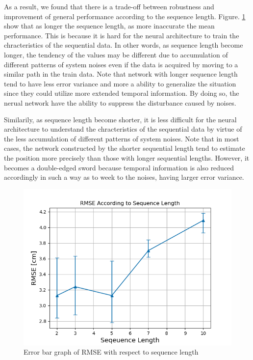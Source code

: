 \documentclass{ieeeaccess}
\begin{document}
As a result, we found that there is a trade-off between robustness and improvement of general performance according to the sequence length. Figure. \ref{fig:seq_length} show that as longer the sequence length, as more inaccurate the mean performance. This is because it is hard for the neural architecture to train the chracteristics of the sequential data. In other words, as sequence length become longer, the tendency of the values may be different due to accumulation of different patterns of system noises even if the data is acquired by moving to a similar path in the train data. Note that network with longer sequence length tend to have less error variance and more a ability to generalize the situation since they could utilize more extended temporal information. By doing so, the nerual network have the ability to suppress the disturbance caused by noises.

Similarily, as sequence length become shorter, it is less difficult for the neural architecture to understand the chracteristics of the sequential data by virtue of the less accumulation of different patterns of system noises. Note that in most cases, the network constructed by the shorter sequential length tend to estimate the position more precisely than those with longer sequential lengths. However, it becomes a double-edged sword because temporal information is also reduced accordingly in such a way as to week to the noises, having larger error variance.

 



\begin{figure}[h!]
	\centering
	\includegraphics[width=0.9\linewidth]{image/seq_result_prototype}
	\caption{Error bar graph of RMSE with respect to sequence length}
	\label{fig:seq_length} 	
\end{figure}
\end{document}
